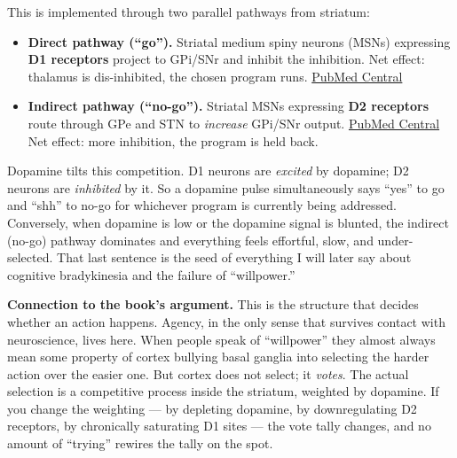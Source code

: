 This is implemented through two parallel pathways from striatum:

\begin{itemize}
\tightlist
\item
  \textbf{Direct pathway (``go'').} Striatal medium spiny neurons (MSNs) expressing \textbf{D1 receptors} project to GPi/SNr and inhibit the inhibition. Net effect: thalamus is dis-inhibited, the chosen program runs. \href{https://pmc.ncbi.nlm.nih.gov/articles/PMC3853485/}{PubMed Central}
\item
  \textbf{Indirect pathway (``no-go'').} Striatal MSNs expressing \textbf{D2 receptors} route through GPe and STN to \emph{increase} GPi/SNr output. \href{https://pmc.ncbi.nlm.nih.gov/articles/PMC3853485/}{PubMed Central} Net effect: more inhibition, the program is held back.
\end{itemize}

Dopamine tilts this competition. D1 neurons are \emph{excited} by dopamine; D2 neurons are \emph{inhibited} by it. So a dopamine pulse simultaneously says ``yes'' to go and ``shh'' to no-go for whichever program is currently being addressed. Conversely, when dopamine is low or the dopamine signal is blunted, the indirect (no-go) pathway dominates and everything feels effortful, slow, and under-selected. That last sentence is the seed of everything I will later say about cognitive bradykinesia and the failure of ``willpower.''

\textbf{Connection to the book's argument.} This is the structure that decides whether an action happens. Agency, in the only sense that survives contact with neuroscience, lives here. When people speak of ``willpower'' they almost always mean some property of cortex bullying basal ganglia into selecting the harder action over the easier one. But cortex does not select; it \emph{votes}. The actual selection is a competitive process inside the striatum, weighted by dopamine. If you change the weighting --- by depleting dopamine, by downregulating D2 receptors, by chronically saturating D1 sites --- the vote tally changes, and no amount of ``trying'' rewires the tally on the spot.


